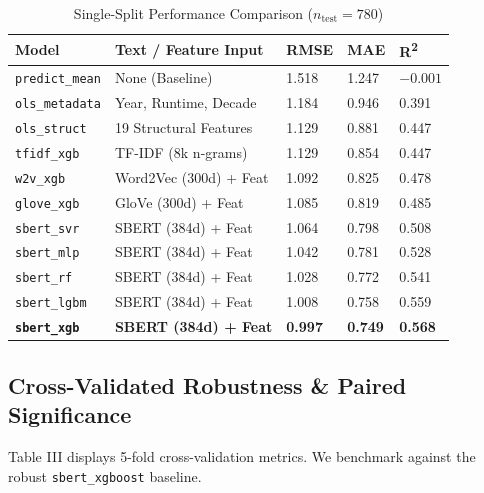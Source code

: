 \documentclass[conference]{IEEEtran}
\begin{document}
\begin{table}[htbp]
\caption{Single-Split Performance Comparison ($n_{\text{test}} = 780$)}
\begin{center}
\begin{tabular}{|l|l|l|l|l|}
\hline
\textbf{Model} & \textbf{Text / Feature Input} & \textbf{RMSE} & \textbf{MAE} & \textbf{R\textsuperscript{2}} \\
\hline
\texttt{predict\_mean} & None (Baseline) & 1.518 & 1.247 & $-0.001$ \\
\hline
\texttt{ols\_metadata} & Year, Runtime, Decade & 1.184 & 0.946 & 0.391 \\
\hline
\texttt{ols\_struct} & 19 Structural Features & 1.129 & 0.881 & 0.447 \\
\hline
\texttt{tfidf\_xgb} & TF-IDF (8k n-grams) & 1.129 & 0.854 & 0.447 \\
\hline
\texttt{w2v\_xgb} & Word2Vec (300d) + Feat & 1.092 & 0.825 & 0.478 \\
\hline
\texttt{glove\_xgb} & GloVe (300d) + Feat & 1.085 & 0.819 & 0.485 \\
\hline
\texttt{sbert\_svr} & SBERT (384d) + Feat & 1.064 & 0.798 & 0.508 \\
\hline
\texttt{sbert\_mlp} & SBERT (384d) + Feat & 1.042 & 0.781 & 0.528 \\
\hline
\texttt{sbert\_rf} & SBERT (384d) + Feat & 1.028 & 0.772 & 0.541 \\
\hline
\texttt{sbert\_lgbm} & SBERT (384d) + Feat & 1.008 & 0.758 & 0.559 \\
\hline
\textbf{\texttt{sbert\_xgb}} & \textbf{SBERT (384d) + Feat} & \textbf{0.997} & \textbf{0.749} & \textbf{0.568} \\
\hline
\end{tabular}
\label{tab2}
\end{center}
\end{table}

\subsection{Cross-Validated Robustness \& Paired Significance}
Table III displays 5-fold cross-validation metrics. We benchmark against the robust \texttt{sbert\_xgboost} baseline.
\end{document}
